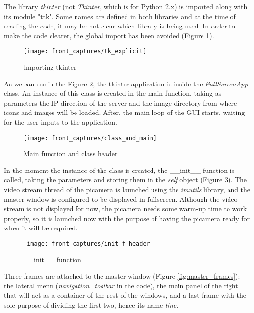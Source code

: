 The library \textit{tkinter} (not \textit{Tkinter}, which is for Python 2.x) is imported along with its module "ttk". Some names are defined in both libraries and at the time of reading the code, it may be not clear which library is being used. In order to make the code clearer, the global import has been avoided (Figure \ref{fig:import_tkinter}). 

\begin{figure}[!ht]
	\centering
	\texttt{[image: front\_captures/tk\_explicit]}
	\caption{Importing tkinter}
	\label{fig:import_tkinter}
\end{figure}

As we can see in the Figure \ref{fig:class_and_main}, the tkinter application is inside the \textit{FullScreenApp} class. An instance of this class is created in the main function, taking as parameters the IP direction of the server and the image directory from where icons and images will be loaded. After, the main loop of the GUI starts, waiting for the user inputs to the application. 

\begin{figure}[!ht]
	\centering
	\texttt{[image: front\_captures/class\_and\_main]}
	\caption{Main function and class header}
	\label{fig:class_and_main}
\end{figure}

In the moment the instance of the class is created, the {\_\_}init{\_\_} function is called, taking the parameters and storing them in the \textit{self} object (Figure \ref{fig:init_head}). The video stream thread of the \gls{picamera} is launched using the \textit{imutils} library, and the master window is configured to be displayed in fullscreen. Although the video stream is not displayed for now, the picamera needs some warm-up time to work properly, so it is launched now with the purpose of having the picamera ready for when it will be required. 

\begin{figure}[!ht]
	\centering
	\texttt{[image: front\_captures/init\_f\_header]}
	\caption{{\_\_}init{\_\_} function}
	\label{fig:init_head}
\end{figure}

Three frames are attached to the master window (Figure \ref{fig:master_frames}): the lateral menu (\textit{navigation{\_}toolbar} in the code), the main panel of the right that will act as a container of the rest of the windows, and a last frame with the sole purpose of dividing the first two, hence its name \textit{line}.


